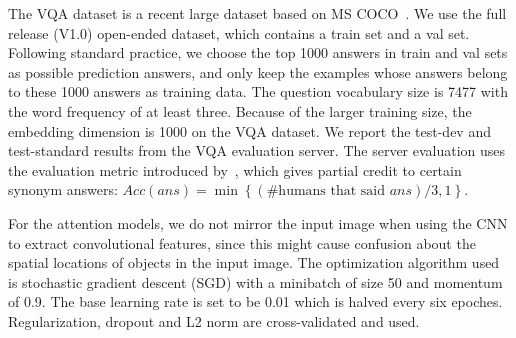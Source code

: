 The VQA dataset is a recent large dataset based on MS COCO~\cite{lin2014microsoft}. We use the full release (V1.0) open-ended dataset, which contains a train set and a val set. Following standard practice, we choose the top 1000 answers in train and val sets as possible prediction answers, and only keep the examples whose answers belong to these 1000 answers as training data. The question vocabulary size is 7477 with the word frequency of at least three.
Because of the larger training size, the embedding dimension is 1000 on the VQA dataset.
We report the test-dev and test-standard results from the VQA evaluation server.
The server evaluation uses the evaluation metric introduced by~\cite{DBLP:journals/corr/AntolALMBZP15}, which gives partial credit to certain synonym answers:
$Acc({ans}) = \min\left\{ (\text{\# humans that said }{ans})/3,1\right\}$.


For the attention models, we do not mirror the input image when using the CNN to extract convolutional features, since this might cause confusion about the spatial locations of objects in the input image.
The optimization algorithm used is stochastic gradient descent (SGD) with a minibatch of size 50 and momentum of 0.9.
The base learning rate is set to be 0.01 which is halved every six epoches. Regularization, dropout and L2 norm are cross-validated and used. 


